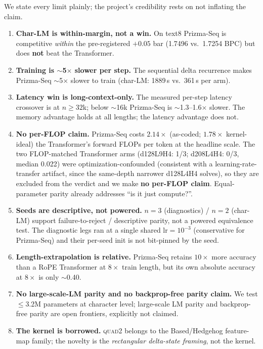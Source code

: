 \documentclass[11pt]{article}
\newcommand{\quadtwo}{\textsc{quad2}}
\begin{document}
We state every limit plainly; the project's credibility rests on not inflating the claim.
\begin{enumerate}
\item \textbf{Char-LM is within-margin, not a win.} On text8 Prizma-Seq is competitive
\emph{within} the pre-registered $+0.05$ bar (1.7496 vs.\ 1.7254 BPC) but does \textbf{not} beat the
Transformer.
\item \textbf{Training is $\sim$5$\times$ slower per step.} The sequential delta recurrence makes
Prizma-Seq $\sim$5$\times$ slower to train (char-LM: 1889\,s vs.\ 361\,s per arm).
\item \textbf{Latency win is long-context-only.} The measured per-step latency crossover is at
$n{\geq}32$k; below $\sim$16k Prizma-Seq is $\sim$1.3--1.6$\times$ slower. The memory advantage holds
at all lengths; the latency advantage does not.
\item \textbf{No per-FLOP claim.} Prizma-Seq costs $2.14\times$ (as-coded; $1.78\times$
kernel-ideal) the Transformer's forward FLOPs per token at the headline scale. The two FLOP-matched Transformer arms (d128L9H4: 1/3; d208L4H4: 0/3,
median 0.022) were optimization-confounded (consistent with a learning-rate-transfer artifact, since
the same-depth narrower d128L4H4 solves), so they are excluded from the verdict and we make
\textbf{no per-FLOP claim}. Equal-parameter parity already addresses ``is it just compute?''.
\item \textbf{Seeds are descriptive, not powered.} $n{=}3$ (diagnostics) / $n{=}2$ (char-LM) support
failure-to-reject / descriptive parity, not a powered equivalence test. The diagnostic legs ran at a
single shared $\text{lr}{=}10^{-3}$ (conservative for Prizma-Seq) and their per-seed init is not
bit-pinned by the seed.
\item \textbf{Length-extrapolation is relative.} Prizma-Seq retains $10\times$ more accuracy than a
RoPE Transformer at $8\times$ train length, but its own absolute accuracy at $8\times$ is only
$\sim$0.40.
\item \textbf{No large-scale-LM parity and no backprop-free parity claim.} We test $\leq$3.2M
parameters at character level; large-scale LM parity and backprop-free parity are open frontiers,
explicitly not claimed.
\item \textbf{The kernel is borrowed.} \quadtwo{} belongs to the Based/Hedgehog feature-map family;
the novelty is the \emph{rectangular delta-state framing}, not the kernel.
\end{enumerate}
\end{document}
